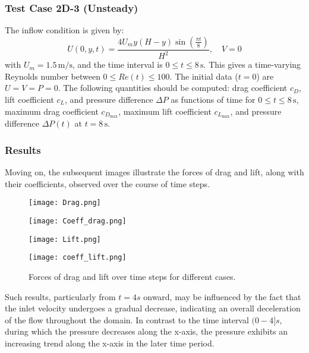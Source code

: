 \documentclass{article}
\begin{document}
\subsubsection{Test Case 2D-3 (Unsteady)}

The inflow condition is given by:
\[
U(0, y, t) = \frac{4U_m y (H - y) \sin\left(\frac{\pi t}{8}\right)}{H^2}, \quad V = 0
\]
with \(U_m = 1.5 \, \text{m/s}\), and the time interval is \(0 \leq t \leq 8 \, \text{s}\). This gives a time-varying Reynolds number between \(0 \leq Re(t) \leq 100\). The initial data (\(t = 0\)) are \(U = V = P = 0\). The following quantities should be computed: drag coefficient \(c_D\), lift coefficient \(c_L\), and pressure difference \(\Delta P\) as functions of time for \(0 \leq t \leq 8 \, \text{s}\), maximum drag coefficient \(c_{D_{\text{max}}}\), maximum lift coefficient \(c_{L_{\text{max}}}\), and pressure difference \(\Delta P(t)\) at \(t = 8 \, \text{s}\).


\subsubsection*{Results}


Moving on, the subsequent images illustrate the forces of drag and lift, along with their coefficients, observed over the course of time steps.

\begin{figure}[h]
    \centering
    \begin{minipage}{0.48\textwidth}
        \centering
        \texttt{[image: Drag.png]}
    \end{minipage}\hfill
    \begin{minipage}{0.48\textwidth}
        \centering
        \texttt{[image: Coeff\_drag.png]}
    \end{minipage}

    \begin{minipage}{0.48\textwidth}
        \centering
        \texttt{[image: Lift.png]}
    \end{minipage}\hfill
    \begin{minipage}{0.48\textwidth}
        \centering
        \texttt{[image: coeff\_lift.png]}
    \end{minipage}

    \caption{Forces of drag and lift over time steps for different cases.}
\end{figure}
Such results, particularly from \(t = 4s\) onward, may be influenced by the fact that the inlet velocity undergoes a gradual decrease, indicating an overall deceleration of the flow throughout the domain. In contrast to the time interval \((0-4]s\), during which the pressure decreases along the x-axis, the pressure exhibits an increasing trend along the x-axis in the later time period. 
\end{document}

